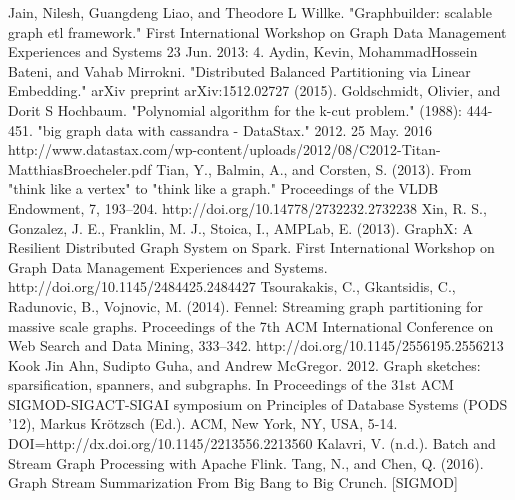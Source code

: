 \documentclass[12pt]{article}
\begin{document}
\begin{thebibliography}{1}
   Jain, Nilesh, Guangdeng Liao, and Theodore L Willke. "Graphbuilder: scalable graph etl framework." First International Workshop on Graph Data Management Experiences and Systems 23 Jun. 2013: 4.
   Aydin, Kevin, MohammadHossein Bateni, and Vahab Mirrokni. "Distributed Balanced Partitioning via Linear Embedding." arXiv preprint arXiv:1512.02727 (2015).
   Goldschmidt, Olivier, and Dorit S Hochbaum. "Polynomial algorithm for the k-cut problem." (1988): 444-451.
   "big graph data with cassandra - DataStax." 2012. 25 May. 2016 http://www.datastax.com/wp-content/uploads/2012/08/C2012-Titan-MatthiasBroecheler.pdf
   Tian, Y., Balmin, A., and Corsten, S. (2013). From "think like a vertex" to "think like a graph." Proceedings of the VLDB Endowment, 7, 193–204. http://doi.org/10.14778/2732232.2732238
   Xin, R. S., Gonzalez, J. E., Franklin, M. J., Stoica, I.,  AMPLab, E. (2013). GraphX: A Resilient Distributed Graph System on Spark. First International Workshop on Graph Data Management Experiences and Systems. http://doi.org/10.1145/2484425.2484427
   Tsourakakis, C., Gkantsidis, C., Radunovic, B.,  Vojnovic, M. (2014). Fennel: Streaming graph partitioning for massive scale graphs. Proceedings of the 7th ACM International Conference on Web Search and Data Mining, 333–342. http://doi.org/10.1145/2556195.2556213
  Kook Jin Ahn, Sudipto Guha, and Andrew McGregor. 2012. Graph sketches: sparsification, spanners, and subgraphs. In Proceedings of the 31st ACM SIGMOD-SIGACT-SIGAI symposium on Principles of Database Systems (PODS '12), Markus Krötzsch (Ed.). ACM, New York, NY, USA, 5-14. DOI=http://dx.doi.org/10.1145/2213556.2213560
   Kalavri, V. (n.d.). Batch and Stream Graph Processing with Apache Flink.
   Tang, N., and Chen, Q. (2016). Graph Stream Summarization From Big Bang to Big Crunch. [SIGMOD]
  
  
  
\end{thebibliography}
\end{document}

